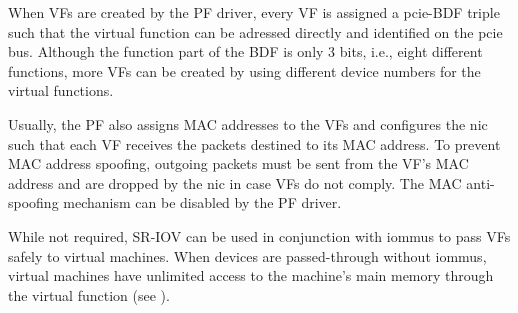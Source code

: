 When VFs are created by the PF driver, every VF is assigned a \ac{pcie}-BDF
triple such that the virtual function can be adressed directly and identified on
the \ac{pcie} bus. Although the function part of the BDF is only 3 bits, i.e.,
eight different functions, more VFs can be created by using different device
numbers for the virtual functions.

Usually, the PF also assigns MAC addresses to the VFs and configures the
\ac{nic} such that each VF receives the packets destined to its MAC address. To
prevent MAC address spoofing, outgoing packets must be sent from the VF's MAC
address and are dropped by the \ac{nic} in case VFs do not comply. The MAC
anti-spoofing mechanism can be disabled by the PF driver.

While not required, SR-IOV can be used in conjunction with \acp{iommu} to pass
VFs safely to virtual machines. When devices are passed-through without
\acp{iommu}, virtual machines have unlimited access to the machine's main memory
through the virtual function (see ).

